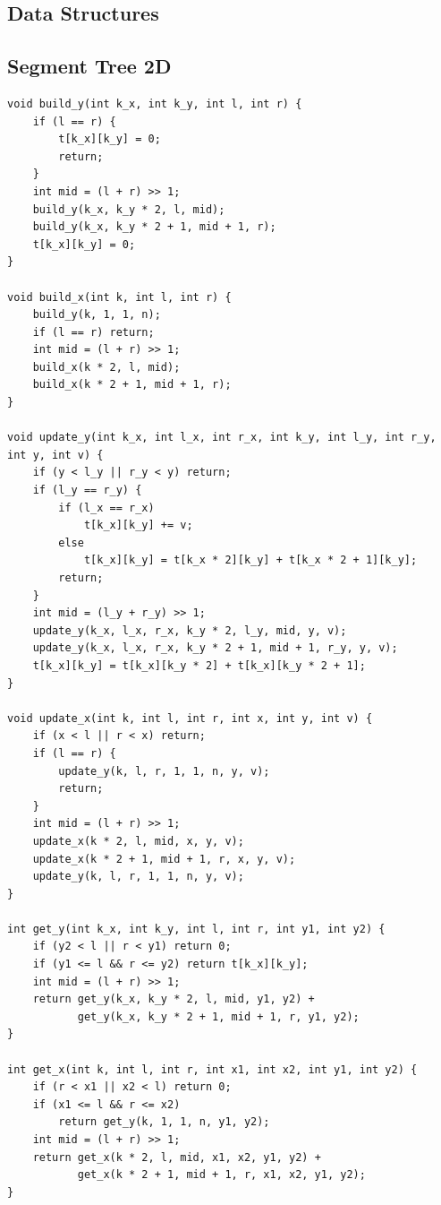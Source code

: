 \documentclass[10pt,landscape]{article}
\begin{document}
\begin{multicols}{2}
\setcounter{page}{1}
\pagestyle{fancy}
\tableofcontents
\newpage

\section{Data Structures}
\subsection{Segment Tree 2D}
\begin{lstlisting}
void build_y(int k_x, int k_y, int l, int r) {
    if (l == r) { 
        t[k_x][k_y] = 0; 
        return;
    }
    int mid = (l + r) >> 1;
    build_y(k_x, k_y * 2, l, mid);
    build_y(k_x, k_y * 2 + 1, mid + 1, r);
    t[k_x][k_y] = 0;
}

void build_x(int k, int l, int r) {
    build_y(k, 1, 1, n);
    if (l == r) return;
    int mid = (l + r) >> 1;
    build_x(k * 2, l, mid);
    build_x(k * 2 + 1, mid + 1, r);
}

void update_y(int k_x, int l_x, int r_x, int k_y, int l_y, int r_y, int y, int v) {
    if (y < l_y || r_y < y) return;
    if (l_y == r_y) {
        if (l_x == r_x)
            t[k_x][k_y] += v;
        else
            t[k_x][k_y] = t[k_x * 2][k_y] + t[k_x * 2 + 1][k_y];
        return;
    }
    int mid = (l_y + r_y) >> 1;
    update_y(k_x, l_x, r_x, k_y * 2, l_y, mid, y, v);
    update_y(k_x, l_x, r_x, k_y * 2 + 1, mid + 1, r_y, y, v);
    t[k_x][k_y] = t[k_x][k_y * 2] + t[k_x][k_y * 2 + 1];
}

void update_x(int k, int l, int r, int x, int y, int v) {
    if (x < l || r < x) return;
    if (l == r) {
        update_y(k, l, r, 1, 1, n, y, v);
        return;
    }
    int mid = (l + r) >> 1;
    update_x(k * 2, l, mid, x, y, v);
    update_x(k * 2 + 1, mid + 1, r, x, y, v);
    update_y(k, l, r, 1, 1, n, y, v);
}

int get_y(int k_x, int k_y, int l, int r, int y1, int y2) {
    if (y2 < l || r < y1) return 0;
    if (y1 <= l && r <= y2) return t[k_x][k_y];
    int mid = (l + r) >> 1;
    return get_y(k_x, k_y * 2, l, mid, y1, y2) +
           get_y(k_x, k_y * 2 + 1, mid + 1, r, y1, y2); 
}

int get_x(int k, int l, int r, int x1, int x2, int y1, int y2) {
    if (r < x1 || x2 < l) return 0;
    if (x1 <= l && r <= x2)
        return get_y(k, 1, 1, n, y1, y2);
    int mid = (l + r) >> 1;
    return get_x(k * 2, l, mid, x1, x2, y1, y2) +
           get_x(k * 2 + 1, mid + 1, r, x1, x2, y1, y2); 
}
\end{lstlisting}

\end{multicols}
\end{document}
